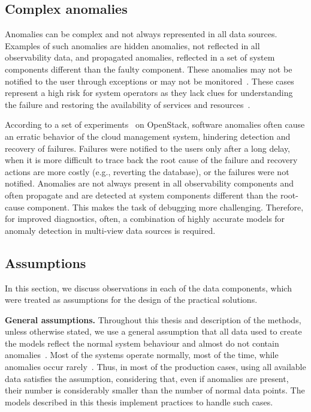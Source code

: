 \subsection{Complex anomalies}\label{ch:concepts:sec:anomalydetectionindistributedsoftwaresystems:subsec:complexanomalies}
Anomalies can be complex and not always represented in all data sources. Examples of such anomalies are hidden anomalies, not reflected in all observability data, and propagated anomalies, reflected in a set of system components different than the faulty component. These anomalies may not be notified to the user through exceptions or may not be monitored~\cite{sillito2020failures}. These cases represent a high risk for system operators as they lack clues for understanding the failure and restoring the availability of services and resources~\cite{gunawi2014bugs,cotroneo2019bad,sillito2020failures}. 

According to a set of experiments~\cite{cotroneo2019bad} on OpenStack, software anomalies often cause an erratic behavior of the cloud management system, hindering detection and recovery of failures. Failures were notified to the users only after a long delay, when it is more difficult to trace back the root cause of the failure and recovery actions are more costly (e.g., reverting the database), or the failures were not notified. Anomalies are not always present in all observability components and often propagate and are detected at system components different than the root-cause component. This makes the task of debugging more challenging. Therefore, for improved diagnostics, often, a combination of highly accurate models for anomaly detection in multi-view data sources is required.

\subsection{Assumptions}
In this section, we discuss observations in each of the data components, which were treated as assumptions for the design of the practical solutions. 

\noindent\textbf{General assumptions.} Throughout this thesis and description of the methods, unless otherwise stated, we use a general assumption that all data used to create the models reflect the normal system behaviour and almost do not contain anomalies~\cite{chandola2009anomaly,ruff2020unifying,ruff2019deep}. Most of the systems operate normally, most of the time, while anomalies occur rarely~\cite{du2017deeplog,meng2019loganomaly,nedelkoski2019anomalymultimodal}. Thus, in most of the production cases, using all available data satisfies the assumption, considering that, even if anomalies are present, their number is considerably smaller than the number of normal data points. The models described in this thesis implement practices to handle such cases. 

